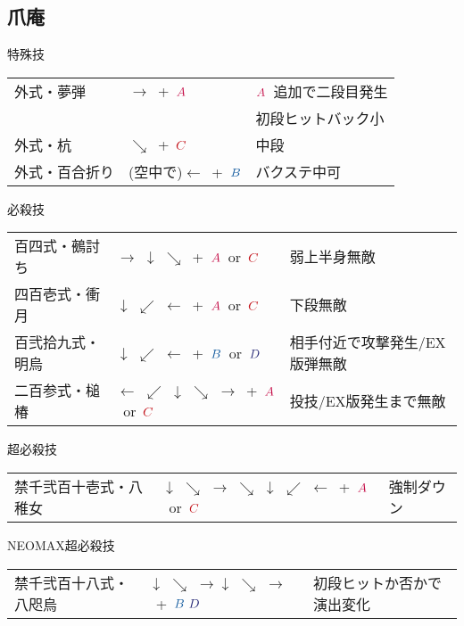 \documentclass[a4j,11pt]{jarticle}
\def\A{\textcolor{Acolor}{A}}
\def\C{\textcolor{Ccolor}{C}}
\def\B{\textcolor{Bcolor}{B}}
\def\D{\textcolor{Dcolor}{D}}
\def\hado{$\downarrow$ $\searrow$ $\rightarrow$}%
\def\tatsu{$\downarrow$ $\swarrow$ $\leftarrow$}%
\def\syoryu{$\rightarrow$ $\downarrow$ $\searrow$}%
\def\yoga{$\leftarrow$ $\swarrow$ $\downarrow$ $\searrow$ $\rightarrow$}%
\def\ryuko{$\downarrow$ $\searrow$ $\rightarrow$ $\searrow$ $\downarrow$ $\swarrow$ $\leftarrow$}%
\begin{document}
\subsection{爪庵}
\begin{itembox}[l]{特殊技}
\begin{tabular}{lll}
外式・夢弾&$\rightarrow$\ +\ $\A$&$\A$\ 追加で二段目発生\\
&&初段ヒットバック小\\%
外式・杭&$\searrow$\ +\ $\C$&中段\\%
外式・百合折り&(空中で)$\leftarrow$\ +\ $\B$&バクステ中可%
\end{tabular}
\end{itembox}
\begin{itembox}[l]{必殺技}
\begin{tabular}{lll}
百四式・鵺討ち&\syoryu\ +\ $\A$\ or\ $\C$&弱上半身無敵\\%
四百壱式・衝月&\tatsu\ +\ $\A$\ or\ $\C$&下段無敵\\ %
百弐拾九式・明烏&\tatsu\ +\ $\B$\ or\ $\D$&相手付近で攻撃発生/EX版弾無敵\\ %
二百参式・槌椿&\yoga\ +\ $\A$\ or\ $\C$&投技/EX版発生まで無敵%
\end{tabular}
\end{itembox}
\begin{itembox}[l]{超必殺技}
\begin{tabular}{lll}
禁千弐百十壱式・八稚女&\ryuko\ +\ $\A$\ or\ $\C$&強制ダウン\\ %
\end{tabular}
\end{itembox}
\begin{itembox}[l]{NEOMAX超必殺技}
\begin{tabular}{lll}
禁千弐百十八式・八咫烏&\hado\hado\ +\ $\B\ \D$&初段ヒットか否かで演出変化%
\end{tabular}
\end{itembox}
\newpage
\end{document}
